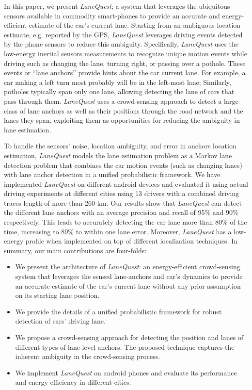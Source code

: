 \documentclass[10pt, conference, compsocconf]{IEEEtran}
\def \sys {\textit{LaneQuest}}
\begin{document}
In this paper, we present \sys{}; a system that leverages the ubiquitous sensors available in commodity smart-phones to provide an accurate and energy-efficient estimate of the car's current lane. Starting from an ambiguous location estimate, e.g. reported by the GPS, \sys{} leverages driving events detected by the phone sensors to reduce this ambiguity. Specifically, \sys{} uses the low-energy inertial sensors measurements to recognize unique motion events while driving such as changing the lane, turning right, or passing over a pothole. These events or ``lane anchors'' provide hints about the car current lane. For example, a car making a left turn most probably will be in the left-most lane; Similarly, potholes typically span only one lane, allowing detecting the lane of cars that pass through them. \sys{} uses a crowd-sensing approach to detect a large class of lane anchors as well as their positions through the road network and the lanes they span, exploiting them as opportunities for reducing the ambiguity in lane estimation.

To handle the sensors' noise, location ambiguity, and error in anchors location estimation, \sys{} models the lane estimation problem as a Markov lane detection problem that combines the car motion events (such as changing lanes) with lane anchor detection in a unified probabilistic framework. We have implemented \sys{} on different android devices and evaluated it using actual driving experiments at different cities using 13 drivers with a combined driving traces length of more than 260 km. Our results show that \sys{} can detect the different lane anchors with an average precision and recall of 95\% and 90\% respectively. This leads to accurately detecting the car lane more than 80\% of the time, increasing to 89\% to within one lane error. Moreover, \sys{} has a low-energy profile when implemented on top of different localization techniques.
In summary, our main contributions are four-folds:
\begin{itemize}
\item We present the architecture of \sys{}: an energy-efficient crowd-sensing system that leverages the sensed lane-anchors and car's dynamics to provide an accurate estimate of the car's current lane without any prior assumption on its starting lane position.
\vspace{-4pt}
\item We provide the details of a unified probabilistic framework for robust detection of cars' driving lane.
\vspace{-4pt}
\item We propose a crowd-sensing approach for detecting the position and lanes of different types of lane-level anchors. The proposed technique captures the inherent ambiguity in the crowd-sensing process.
\vspace{-4pt}
\item We implement \sys{} on android phones and evaluate its performance and energy-efficiency in different cities.
\end{itemize}
\end{document}
